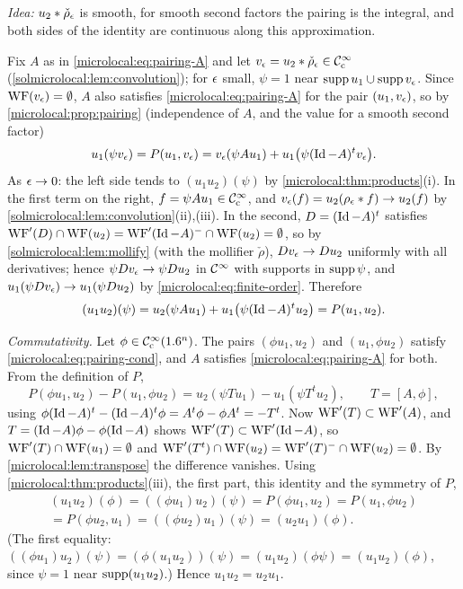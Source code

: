 \subsection*{}
\emph{Idea:} $u_2*\check\rho_\epsilon$ is smooth, for smooth second factors the pairing is the integral,
and both sides of the identity are continuous along this approximation.

Fix $A$ as in \eqref{microlocal:eq:pairing-A} and let $v_\epsilon=u_2*\check\rho_\epsilon\in\mathcal{C}^\infty_{\mathrm{c}}$
(\cref{solmicrolocal:lem:convolution}); for $\epsilon$ small, $\psi=1$ near $\operatorname{supp} u_1\cup\operatorname{supp} v_\epsilon$. Since
$\operatorname{WF}(v_\epsilon)=\emptyset$, $A$ also satisfies \eqref{microlocal:eq:pairing-A} for the pair $(u_1,v_\epsilon)$, so by
\cref{microlocal:prop:pairing} (independence of $A$, and the value for a smooth second factor)
\begin{equation*}
  u_1(\psi v_\epsilon)=P(u_1,v_\epsilon)=v_\epsilon(\psi Au_1)+u_1\bigl(\psi(\operatorname{Id}-A)^tv_\epsilon\bigr).
\end{equation*}
As $\epsilon\to0$: the left side tends to $(u_1u_2)(\psi)$ by \cref{microlocal:thm:products}(i). In the first
term on the right, $f=\psi Au_1\in\mathcal{C}^\infty_{\mathrm{c}}$, and $v_\epsilon(f)=u_2(\rho_\epsilon*f)\to u_2(f)$ by
\cref{solmicrolocal:lem:convolution}(ii),(iii). In the second, $D=(\operatorname{Id}-A)^t$ satisfies
$\operatorname{WF}'(D)\cap\operatorname{WF}(u_2)=\operatorname{WF}'(\operatorname{Id}-A)^-\cap\operatorname{WF}(u_2)=\emptyset$, so by \cref{solmicrolocal:lem:mollify}
(with the mollifier $\check\rho$), $Dv_\epsilon\to Du_2$ uniformly with all derivatives; hence
$\psi Dv_\epsilon\to\psi Du_2$ in $\mathcal{C}^\infty$ with supports in $\operatorname{supp}\psi$, and
$u_1(\psi Dv_\epsilon)\to u_1(\psi Du_2)$ by \eqref{microlocal:eq:finite-order}. Therefore
\begin{equation*}
  (u_1u_2)(\psi)=u_2(\psi Au_1)+u_1\bigl(\psi(\operatorname{Id}-A)^tu_2\bigr)=P(u_1,u_2).
\end{equation*}

\emph{Commutativity.} Let $\phi\in\mathcal{C}^\infty_{\mathrm{c}}(1.6^n)$. The pairs $(\phi u_1,u_2)$ and $(u_1,\phi u_2)$ satisfy
\eqref{microlocal:eq:pairing-cond}, and $A$ satisfies \eqref{microlocal:eq:pairing-A} for both. From the
definition of $P$,
\begin{equation*}
  P(\phi u_1,u_2)-P(u_1,\phi u_2)=u_2(\psi Tu_1)-u_1(\psi T^tu_2),\qquad T=[A,\phi],
\end{equation*}
using $\phi(\operatorname{Id}-A)^t-(\operatorname{Id}-A)^t\phi=A^t\phi-\phi A^t=-T^t$. Now $\operatorname{WF}'(T)\subset\operatorname{WF}'(A)$, and
$T=(\operatorname{Id}-A)\phi-\phi(\operatorname{Id}-A)$ shows $\operatorname{WF}'(T)\subset\operatorname{WF}'(\operatorname{Id}-A)$, so
$\operatorname{WF}'(T)\cap\operatorname{WF}(u_1)=\emptyset$ and $\operatorname{WF}'(T^t)\cap\operatorname{WF}(u_2)=\operatorname{WF}'(T)^-\cap\operatorname{WF}(u_2)=\emptyset$. By
\cref{microlocal:lem:transpose} the difference vanishes. Using \cref{microlocal:thm:products}(iii),
the first part, this identity and the symmetry of $P$,
\begin{multline*}
  (u_1u_2)(\phi)=((\phi u_1)u_2)(\psi)=P(\phi u_1,u_2)=P(u_1,\phi u_2)\\
  =P(\phi u_2,u_1)=((\phi u_2)u_1)(\psi)=(u_2u_1)(\phi).
\end{multline*}
(The first equality: $((\phi u_1)u_2)(\psi)=(\phi(u_1u_2))(\psi)=(u_1u_2)(\phi\psi)=(u_1u_2)(\phi)$, since
$\psi=1$ near $\operatorname{supp}(u_1u_2)$.) Hence $u_1u_2=u_2u_1$.

